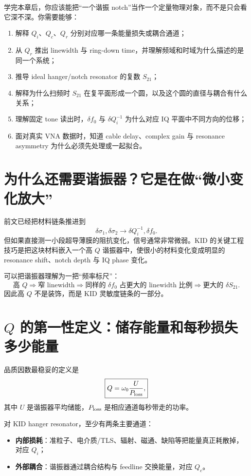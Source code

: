 \documentclass[11pt,a4paper,openany]{ctexrep}
\begin{document}
\begin{goalbox}
学完本章后，你应该能把“一个谐振 notch”当作一个定量物理对象，而不是只会看它深不深。你需要能够：
\begin{enumerate}
  \item 解释 $Q_i$、$Q_c$、$Q_r$ 分别对应哪一条能量损失或耦合通道；
  \item 从 $Q_r$ 推出 linewidth 与 ring-down time，并理解频域和时域为什么描述的是同一个系统；
  \item 推导 ideal hanger/notch resonator 的复数 $S_{21}$；
  \item 解释为什么扫频时 $S_{21}$ 在复平面形成一个圆，以及这个圆的直径与耦合有什么关系；
  \item 理解固定 tone 读出时，$\delta f_0$ 与 $\delta Q_i^{-1}$ 为什么对应 IQ 平面中不同方向的位移；
  \item 面对真实 VNA 数据时，知道 cable delay、complex gain 与 resonance asymmetry 为什么必须先处理或一起拟合。
\end{enumerate}
\end{goalbox}

\section{为什么还需要谐振器？它是在做“微小变化放大”}

前文已经把材料链条推进到
\[
\delta\sigma_1,\delta\sigma_2
\rightarrow
\delta Q_i^{-1},\delta f_0.
\]
但如果直接测一小段超导薄膜的阻抗变化，信号通常非常微弱。KID 的关键工程技巧是把这块材料嵌入一个高 $Q$ 谐振器中，使很小的材料变化变成明显的 resonance shift、notch depth 与 IQ phase 变化。

可以把谐振器理解为一把“频率标尺”：
\[
\boxed{
\text{高 }Q
\Rightarrow
\text{窄 linewidth}
\Rightarrow
\text{同样的 }\delta f_0\text{ 占更大的 linewidth 比例}
\Rightarrow
\text{更大的 }\delta S_{21}.
}
\]
因此高 $Q$ 不是装饰，而是 KID 灵敏度链条的一部分。

\section{$Q$ 的第一性定义：储存能量和每秒损失多少能量}

品质因数最稳妥的定义是
\[
\boxed{
Q=\omega_0\frac{U}{P_{\rm loss}},
}
\]
其中 $U$ 是谐振器平均储能，$P_{\rm loss}$ 是相应通道每秒带走的功率。

对 KID hanger resonator，至少有两条主要通道：
\begin{itemize}
  \item \textbf{内部损耗}：准粒子、电介质/TLS、辐射、磁通、缺陷等把能量真正耗散掉，对应 $Q_i$；
  \item \textbf{外部耦合}：谐振器通过耦合结构与 feedline 交换能量，对应 $Q_c$。
\end{itemize}
\end{document}
